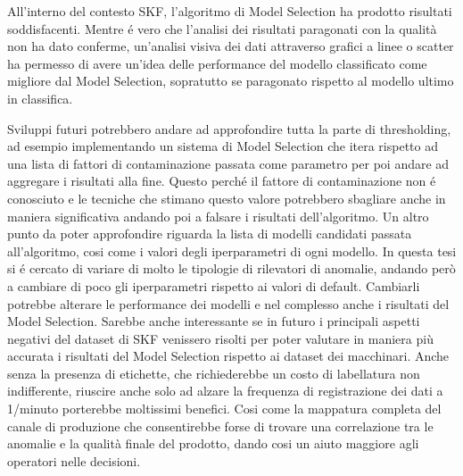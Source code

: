 All'interno del contesto SKF, l'algoritmo di Model Selection ha prodotto risultati soddisfacenti. Mentre é vero che l'analisi dei risultati paragonati con la qualità non ha dato conferme, un'analisi visiva dei dati attraverso grafici a linee o scatter ha permesso di avere un'idea delle performance del modello classificato come migliore dal Model Selection, sopratutto se paragonato rispetto al modello ultimo in classifica.

Sviluppi futuri potrebbero andare ad approfondire tutta la parte di thresholding, ad esempio implementando un sistema di Model Selection che itera rispetto ad una lista di fattori di contaminazione passata come parametro per poi andare ad aggregare i risultati alla fine. Questo perché il fattore di contaminazione non é conosciuto e le tecniche che stimano questo valore potrebbero sbagliare anche in maniera significativa andando poi a falsare i risultati dell'algoritmo.
Un altro punto da poter approfondire riguarda la lista di modelli candidati passata all'algoritmo, cosi come i valori degli iperparametri di ogni modello. In questa tesi si é cercato di variare di molto le tipologie di rilevatori di anomalie, andando però a cambiare di poco gli iperparametri rispetto ai valori di default. Cambiarli potrebbe alterare le performance dei modelli e nel complesso anche i risultati del Model Selection.
Sarebbe anche interessante se in futuro i principali aspetti negativi del dataset di SKF venissero risolti per poter valutare in maniera più accurata i risultati del Model Selection rispetto ai dataset dei macchinari. Anche senza la presenza di etichette, che richiederebbe un costo di labellatura non indifferente, riuscire anche solo ad alzare la frequenza di registrazione dei dati a 1/minuto porterebbe moltissimi benefici. Cosi come la mappatura completa del canale di produzione che consentirebbe forse di trovare una correlazione tra le anomalie e la qualità finale del prodotto, dando cosi un aiuto maggiore agli operatori nelle decisioni.